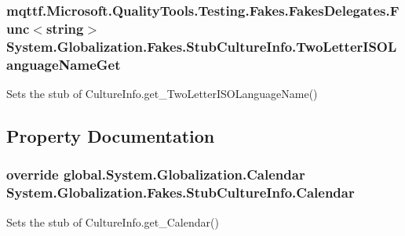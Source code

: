 \hypertarget{class_system_1_1_globalization_1_1_fakes_1_1_stub_culture_info_aede51a398f7b3fab646986c297cf3e9d}{
\subsubsection[{Two\-Letter\-I\-S\-O\-Language\-Name\-Get}]{\setlength{\rightskip}{0pt plus 5cm}mqttf.\-Microsoft.\-Quality\-Tools.\-Testing.\-Fakes.\-Fakes\-Delegates.\-Func$<$string$>$ System.\-Globalization.\-Fakes.\-Stub\-Culture\-Info.\-Two\-Letter\-I\-S\-O\-Language\-Name\-Get}}\label{class_system_1_1_globalization_1_1_fakes_1_1_stub_culture_info_aede51a398f7b3fab646986c297cf3e9d}


Sets the stub of Culture\-Info.\-get\-\_\-\-Two\-Letter\-I\-S\-O\-Language\-Name()



\subsection{Property Documentation}
\hypertarget{class_system_1_1_globalization_1_1_fakes_1_1_stub_culture_info_ab17d4b744aac9a530fb1cdf5c17d5798}{
\subsubsection[{Calendar}]{\setlength{\rightskip}{0pt plus 5cm}override global.\-System.\-Globalization.\-Calendar System.\-Globalization.\-Fakes.\-Stub\-Culture\-Info.\-Calendar\hspace{0.3cm}{\ttfamily [get]}}}\label{class_system_1_1_globalization_1_1_fakes_1_1_stub_culture_info_ab17d4b744aac9a530fb1cdf5c17d5798}


Sets the stub of Culture\-Info.\-get\-\_\-\-Calendar()

